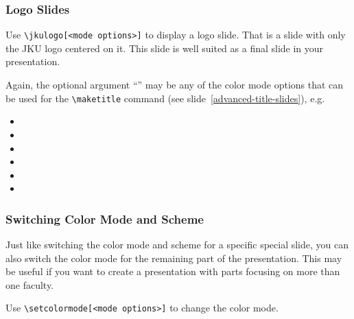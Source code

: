 \documentclass[utf8,aspectratio=169,ngerman,english]{beamer}
\begin{document}


\begin{frame}[containsverbatim]
\frametitle{Logo Slides}

Use \verb|\jkulogo[<mode options>]| to display a logo slide. That is a slide with only the JKU logo centered on it. This slide is well suited as a final slide in your presentation.

Again, the optional argument ``'' may be any of the color mode options that can be used for the \verb|\maketitle| command (see slide~\ref{advanced-title-slides}), e.g.
\begin{itemize}
\item \textverb{\string\jkulogo}
\item \textverb{\string\jkulogo[light]}
\item \textverb{\string\jkulogo[dark]}
\item {}
\item \textverb{\string\jkulogo[gray]}
\item \textverb{\string\jkulogo[black]}
\end{itemize}
\end{frame}

\jkulogo
\jkulogo[light]
\jkulogo[dark]
\jkulogo[gray]
\jkulogo[black]


\begin{frame}[containsverbatim]
\frametitle{Switching Color Mode and Scheme}

Just like switching the color mode and scheme for a specific special slide, you can also switch the color mode for the remaining part of the presentation. This may be useful if you want to create a presentation with parts focusing on more than one faculty.

Use \verb|\setcolormode[<mode options>]| to change the color mode.
\end{frame}
\end{document}

